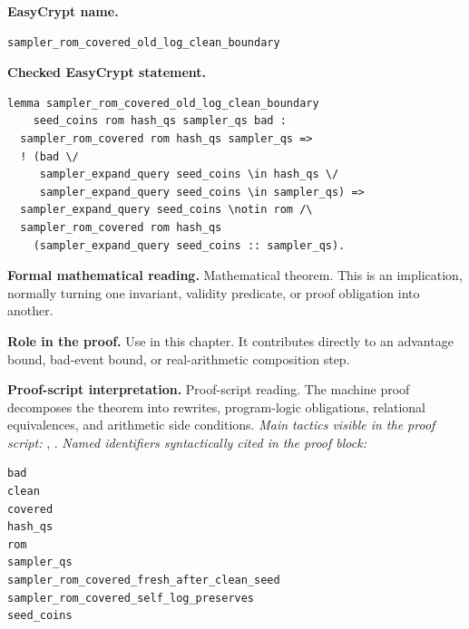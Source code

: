 \begin{formaltheorem}
\noindent\textbf{EasyCrypt name.}
\begin{lstlisting}[language=EasyCrypt,basicstyle=\ttfamily\scriptsize]
sampler_rom_covered_old_log_clean_boundary
\end{lstlisting}
\noindent\textbf{Checked EasyCrypt statement.}
\begin{lstlisting}[language=EasyCrypt,basicstyle=\ttfamily\scriptsize]
lemma sampler_rom_covered_old_log_clean_boundary
    seed_coins rom hash_qs sampler_qs bad :
  sampler_rom_covered rom hash_qs sampler_qs =>
  ! (bad \/
     sampler_expand_query seed_coins \in hash_qs \/
     sampler_expand_query seed_coins \in sampler_qs) =>
  sampler_expand_query seed_coins \notin rom /\
  sampler_rom_covered rom hash_qs
    (sampler_expand_query seed_coins :: sampler_qs).
\end{lstlisting}
\noindent\textbf{Formal mathematical reading.}
Mathematical theorem. This is an implication, normally turning one invariant, validity predicate, or proof obligation into another.

\noindent\textbf{Role in the proof.}
Use in this chapter. It contributes directly to an advantage bound, bad-event bound, or real-arithmetic composition step.

\noindent\textbf{Proof-script interpretation.}
Proof-script reading. The machine proof decomposes the theorem into rewrites, program-logic obligations, relational equivalences, and arithmetic side conditions.
\emph{Main tactics visible in the proof script:} \ec{split}, \ec{apply}.
\emph{Named identifiers syntactically cited in the proof block:}
\begin{lstlisting}[language=EasyCrypt,basicstyle=\ttfamily\scriptsize]
bad
clean
covered
hash_qs
rom
sampler_qs
sampler_rom_covered_fresh_after_clean_seed
sampler_rom_covered_self_log_preserves
seed_coins
\end{lstlisting}

\end{formaltheorem}

